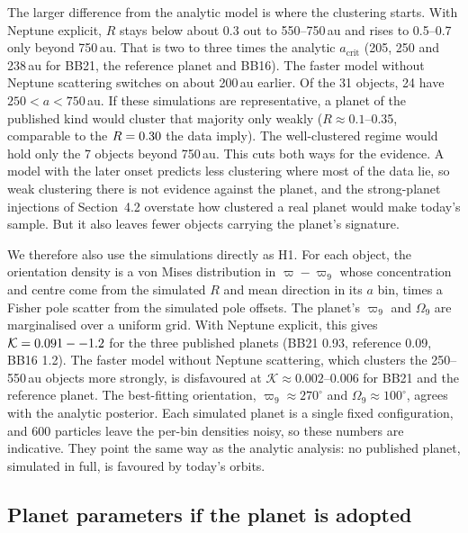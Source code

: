\documentclass[twocolumn,linenumbers]{aastex631}
\newcommand{\vpi}{\varpi}
\newcommand{\Kbf}{\mathcal{K}}
\begin{document}
The larger difference from the analytic model is where the clustering starts. With Neptune explicit, $R$ stays below about 0.3 out to 550--750\,au and rises to 0.5--0.7 only beyond 750\,au. That is two to three times the analytic $a_\mathrm{crit}$ (205, 250 and 238\,au for BB21, the reference planet and BB16). The faster model without Neptune scattering switches on about 200\,au earlier. Of the 31 objects, 24 have $250<a<750$\,au. If these simulations are representative, a planet of the published kind would cluster that majority only weakly ($R\approx0.1$--0.35, comparable to the $R=0.30$ the data imply). The well-clustered regime would hold only the 7 objects beyond 750\,au. This cuts both ways for the evidence. A model with the later onset predicts less clustering where most of the data lie, so weak clustering there is not evidence against the planet, and the strong-planet injections of Section~4.2 overstate how clustered a real planet would make today's sample. But it also leaves fewer objects carrying the planet's signature.

We therefore also use the simulations directly as H1. For each object, the orientation density is a von Mises distribution in $\vpi-\vpi_9$ whose concentration and centre come from the simulated $R$ and mean direction in its $a$ bin, times a Fisher pole scatter from the simulated pole offsets. The planet's $\vpi_9$ and $\Omega_9$ are marginalised over a uniform grid. With Neptune explicit, this gives $\Kbf=\NbodyKrange$ for the three published planets (BB21 0.93, reference 0.09, BB16 1.2). The faster model without Neptune scattering, which clusters the 250--550\,au objects more strongly, is disfavoured at $\Kbf\approx0.002$--0.006 for BB21 and the reference planet. The best-fitting orientation, $\vpi_9\approx270^\circ$ and $\Omega_9\approx100^\circ$, agrees with the analytic posterior. Each simulated planet is a single fixed configuration, and 600 particles leave the per-bin densities noisy, so these numbers are indicative. They point the same way as the analytic analysis: no published planet, simulated in full, is favoured by today's orbits.

\subsection{Planet parameters if the planet is adopted}\label{sec:posterior}
\end{document}
